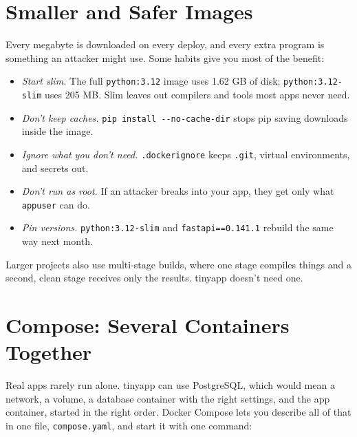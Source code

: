 \section{Smaller and Safer Images}\label{05-docker-in-practice:smaller-and-safer-images}

Every megabyte is downloaded on every deploy, and every extra program is something an attacker might use. Some habits give you most of the benefit:

\begin{itemize}
\tightlist
\item
  \emph{Start slim.} The full \texttt{python:3.12} image uses 1.62 GB of disk; \texttt{python:3.12-slim} uses 205 MB. Slim leaves out compilers and tools most apps never need.
\item
  \emph{Don't keep caches.} \texttt{pip\ install\ -}\allowbreak{}\texttt{-}\allowbreak{}\texttt{no-}\allowbreak{}\texttt{cache-}\allowbreak{}\texttt{dir} stops pip saving downloads inside the image.
\item
  \emph{Ignore what you don't need.} \texttt{.dockerignore} keeps \texttt{.git}, virtual environments, and secrets out.
\item
  \emph{Don't run as root.} If an attacker breaks into your app, they get only what \texttt{appuser} can do.
\item
  \emph{Pin versions.} \texttt{python:3.12-slim} and \texttt{fastapi==0.141.1} rebuild the same way next month.
\end{itemize}

Larger projects also use multi-stage builds, where one stage compiles things and a second, clean stage receives only the results. tinyapp doesn't need one.

\section{Compose: Several Containers Together}\label{05-docker-in-practice:compose-several-containers-together}

Real apps rarely run alone. tinyapp can use PostgreSQL, which would mean a network, a volume, a database container with the right settings, and the app container, started in the right order. Docker Compose lets you describe all of that in one file, \texttt{compose.yaml}, and start it with one command:

